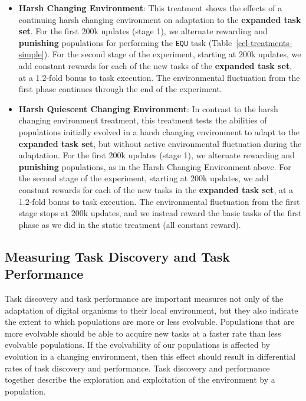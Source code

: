 \documentclass[10pt,letterpaper,final]{article}
\begin{document}
\begin{itemize}
	\item \textbf{Harsh Changing Environment}: This treatment shows the effects of a continuing harsh changing environment on adaptation to the \textbf{expanded task set}. For the first 200k updates (stage 1), we alternate rewarding and \textbf{punishing} populations for performing the \texttt{EQU} task (Table~\ref{cel-treatments-simple}). For the second stage of the experiment, starting at 200k updates, we add constant rewards for each of the new tasks of the \textbf{expanded task set}, at a 1.2-fold bonus to task execution. The environmental fluctuation from the first phase continues through the end of the experiment.

	\item \textbf{Harsh Quiescent Changing Environment}: In contrast to the harsh changing environment treatment, this treatment tests the abilities of populations initially evolved in a harsh changing environment to adapt to the \textbf{expanded task set}, but without active environmental fluctuation during the adaptation. For the first 200k updates (stage 1), we alternate rewarding and \textbf{punishing} populations, as in the Harsh Changing Environment above. For the second stage of the experiment, starting at 200k updates, we add constant rewards for each of the new tasks in the \textbf{expanded task set}, at a 1.2-fold bonus to task execution. The environmental fluctuation from the first stage stops at 200k updates, and we instead reward the basic tasks of the first phase as we did in the static treatment (all constant reward).
\end{itemize}




\subsection*{Measuring Task Discovery and Task Performance}
Task discovery and task performance are important measures not only of the adaptation of digital organisms to their local environment, but they also indicate the extent to which populations are more or less evolvable. Populations that are more evolvable should be able to acquire new tasks at a faster rate than less evolvable populations. If the evolvability of our populations is affected by evolution in a changing environment, then this effect should result in differential rates of task discovery and performance. Task discovery and performance together describe the exploration and exploitation of the environment by a population. 
\end{document}
